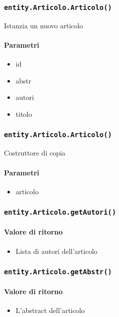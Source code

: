 \subsubsection{\texttt{entity.Articolo.Articolo()}}
Istanzia un nuovo articolo
\paragraph{Parametri}
\begin{itemize}
\item id
\item abstr
\item autori
\item titolo
\end{itemize}

\subsubsection{\texttt{entity.Articolo.Articolo()}}
Costruttore di copia
\paragraph{Parametri}
\begin{itemize}
\item articolo
\end{itemize}

\subsubsection{\texttt{entity.Articolo.getAutori()}}
\paragraph{Valore di ritorno}
\begin{itemize}
\item Lista di autori dell'articolo
\end{itemize}

\subsubsection{\texttt{entity.Articolo.getAbstr()}}
\paragraph{Valore di ritorno}
\begin{itemize}
\item L'abstract dell'articolo
\end{itemize}

